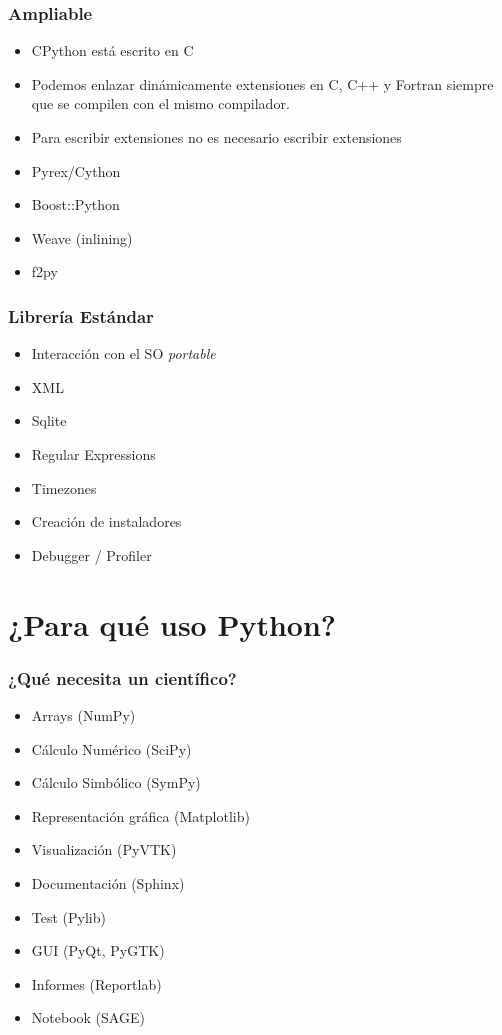 \documentclass[12pt,mathserif,compress]{beamer}
\begin{document}
\begin{frame}
  \frametitle{Ampliable}
  \begin{itemize}
  \item CPython está escrito en C
  \item Podemos enlazar dinámicamente extensiones en C, C++ y Fortran
    siempre que se compilen con el mismo compilador.
  \item Para escribir extensiones no es necesario escribir extensiones
\pause
  \item Pyrex/Cython
  \item Boost::Python
  \item Weave (inlining)
  \item f2py
  \end{itemize}
\end{frame}


\begin{frame}
 \frametitle{Librería Estándar}
 \begin{itemize}
 \item Interacción con el SO \emph{portable}
 \item XML
 \item Sqlite
 \item Regular Expressions
 \item Timezones
 \item Creación de instaladores
 \item Debugger / Profiler
 \end{itemize}
\end{frame}

\section{¿Para qué uso Python?}
\begin{frame}
  \frametitle{¿Qué necesita un científico?}
  \begin{itemize}
  \item Arrays (NumPy)
  \item Cálculo Numérico (SciPy)
  \item Cálculo Simbólico (SymPy)
  \item Representación gráfica (Matplotlib)
  \item Visualización (PyVTK)
  \item Documentación (Sphinx)
  \item Test (Pylib)
  \item GUI (PyQt, PyGTK)
  \item Informes (Reportlab)
  \item Notebook (SAGE)
  \end{itemize}
\end{frame}
\end{document}
